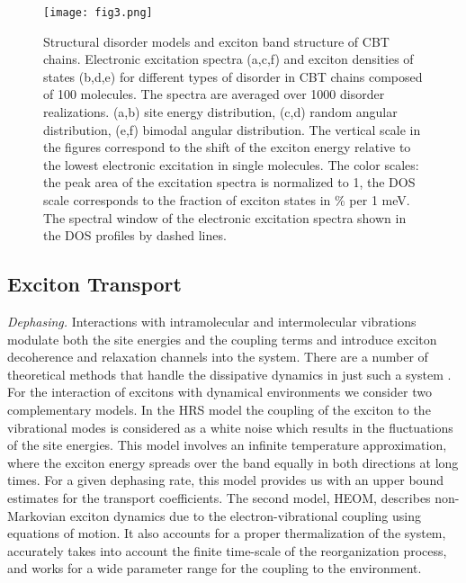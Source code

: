 \documentclass[journal=jacs,manuscript=article]{achemso}
\begin{document}
\begin{figure}
\begin{center}
\texttt{[image: fig3.png]}
\caption{Structural disorder models and exciton band structure of CBT chains. Electronic excitation spectra (a,c,f) and exciton densities of states (b,d,e) for different types of disorder in  CBT chains composed of 100 molecules. The spectra are averaged over 1000 disorder realizations. (a,b) site energy distribution, (c,d) random angular distribution, (e,f) bimodal angular distribution. The vertical scale in the figures correspond to the shift of the exciton energy relative to the lowest electronic excitation in single molecules. The color scales: the peak area of the excitation spectra is normalized to 1, the DOS scale corresponds to the fraction of exciton states in \% per 1 meV. The spectral window of the electronic excitation spectra shown in the DOS profiles by dashed lines.}
\label{fig:spectra}
\end{center}
\end{figure}


\subsection{Exciton Transport}
\textit{Dephasing.} Interactions with intramolecular and intermolecular vibrations modulate both the site energies and the coupling terms and introduce exciton decoherence and relaxation channels into the system.
There are a number of theoretical methods that handle the dissipative dynamics in just such a system \cite{Haken1972,IsFl09_234111_,RoStEi10_5060_,ScTe91_421_,SKS_NanoPh2013}. For the interaction of excitons with dynamical environments we consider two complementary models. In the HRS model \cite{Haken1972,Haken1973} the coupling of the exciton to the vibrational modes is considered as a white noise which results in the fluctuations of the site energies. This model involves an infinite temperature approximation, where the exciton energy spreads over the band equally in both directions at long times. For a given dephasing rate, this model provides us with an upper bound estimates for the transport coefficients. The second model, HEOM, describes non-Markovian exciton dynamics due to the electron-vibrational coupling using equations of motion. It also accounts for a proper thermalization of the system, accurately takes into account the finite time-scale of the reorganization process, and works for a wide parameter range for the coupling to the environment.
\end{document}
